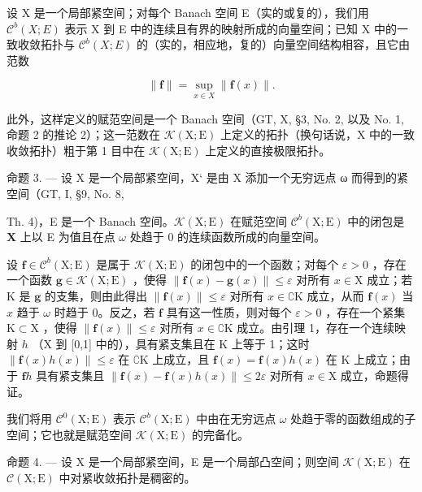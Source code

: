 设 X 是一个局部紧空间；对每个 Banach 空间 E（实的或复的），我们用 \(\mathcal{C}^{b}(X;E)\) 表示 X 到 E 中的连续且有界的映射所成的向量空间；已知 X 中的一致收敛拓扑与 \(\mathcal{C}^{b}(X;E)\) 的（实的，相应地，复的）向量空间结构相容，且它由范数

\[
\| \mathbf {f} \| = \sup _ {x \in X} \| \mathbf {f} (x) \|.\tag{3}
\]

此外，这样定义的赋范空间是一个 Banach 空间（GT, X, §3, No. 2, 以及 No. 1, 命题 2 的推论 2）；这一范数在 \(\mathcal{K}(\mathrm{X};\mathrm{E})\) 上定义的拓扑（换句话说，X 中的一致收敛拓扑）粗于第 1 目中在 \(\mathcal{K}(\mathrm{X};\mathrm{E})\) 上定义的直接极限拓扑。

命题 3. --- 设 X 是一个局部紧空间，X‘ 是由 X 添加一个无穷远点 ω 而得到的紧空间（GT, I, §9, No. 8,

Th. 4)，E 是一个 Banach 空间。\(\mathcal{K}(\mathrm{X};\mathrm{E})\) 在赋范空间 \(\mathcal{C}^b (\mathrm{X};\mathrm{E})\) 中的闭包是 \(\mathbf{X}\) 上以 E 为值且在点 \(\omega\) 处趋于 0 的连续函数所成的向量空间。

设 \(\mathbf{f} \in \mathcal{C}^b(\mathrm{X};\mathrm{E})\) 是属于 \(\mathcal{K}(\mathrm{X};\mathrm{E})\) 的闭包中的一个函数；对每个 \(\varepsilon > 0\) ，存在一个函数 \(\mathbf{g} \in \mathcal{K}(\mathrm{X};\mathrm{E})\) ，使得 \(\| \mathbf{f}(x) - \mathbf{g}(x) \| \leqslant \varepsilon\) 对所有 \(x \in \mathrm{X}\) 成立；若 \(\mathrm{K}\) 是 \(\mathbf{g}\) 的支集，则由此得出 \(\| \mathbf{f}(x) \| \leqslant \varepsilon\) 对所有 \(x \in \complement \mathrm{K}\) 成立，从而 \(\mathbf{f}(x)\) 当 \(x\) 趋于 \(\omega\) 时趋于 0。反之，若 \(\mathbf{f}\) 具有这一性质，则对每个 \(\varepsilon > 0\) ，存在一个紧集 \(\mathrm{K} \subset \mathrm{X}\) ，使得 \(\| \mathbf{f}(x) \| \leqslant \varepsilon\) 对所有 \(x \in \complement \mathrm{K}\) 成立。由引理 1，存在一个连续映射 \(h\) （X 到 {[}0,1{]} 中的），具有紧支集且在 \(\mathrm{K}\) 上等于 1；这时 \(\| \mathbf{f}(x) h(x) \| \leqslant \varepsilon\) 在 \(\complement \mathrm{K}\) 上成立，且 \(\mathbf{f}(x) = \mathbf{f}(x) h(x)\) 在 \(\mathrm{K}\) 上成立；由于 \(\mathbf{f}h\) 具有紧支集且 \(\| \mathbf{f}(x) - \mathbf{f}(x) h(x) \| \leqslant 2\varepsilon\) 对所有 \(x \in \mathrm{X}\) 成立，命题得证。

我们将用 \(\mathcal{C}^{0}(\mathrm{X};\mathrm{E})\) 表示 \(\mathcal{C}^{b}(\mathrm{X};\mathrm{E})\) 中由在无穷远点 \(\omega\) 处趋于零的函数组成的子空间；它也就是赋范空间 \(\mathcal{K}(\mathrm{X};\mathrm{E})\) 的完备化。

命题 4. --- 设 X 是一个局部紧空间，E 是一个局部凸空间；则空间 \(\mathcal{K}(\mathrm{X};\mathrm{E})\) 在 \(\mathcal{C}(\mathrm{X};\mathrm{E})\) 中对紧收敛拓扑是稠密的。

